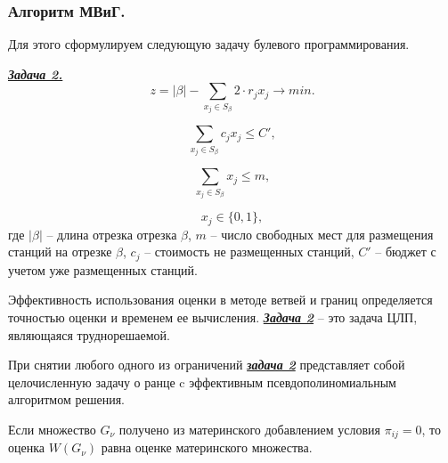 \begin{frame}
    
    \frametitle{Алгоритм МВиГ.}
    \fontsize{8pt}{7.2}\selectfont
    Для этого сформулируем следующую задачу булевого программирования.

    \underline{\textit{\textbf{Задача 2.}}}
    \begin{displaymath}\label{present:task2}
        z = |\beta| - \sum\limits_{x_j \in S_\beta} 2 \cdot r_j x_j \rightarrow min.
    \end{displaymath}

    \begin{displaymath}\label{eq:part4_task2_cost}
        \sum\limits_{x_j \in S_\beta} c_j x_j \leqslant C',
    \end{displaymath}

    \begin{displaymath}\label{eq:part4_task2_m}
        \sum\limits_{x_j \in S_\beta} x_j \leqslant m,
    \end{displaymath}

    \begin{displaymath}
        x_j \in \{0, 1\},
    \end{displaymath}
    где $|\beta|$ -- длина отрезка отрезка  $\beta$, $m$ -- число свободных мест для размещения станций на отрезке $\beta$, $c_j$ -- стоимость не размещенных станций, $C'$ -- бюджет с учетом уже размещенных станций.

    \bigskip
    Эффективность использования оценки в методе ветвей и границ определяется точностью оценки и временем ее вычисления. \underline{\textit{\textbf{Задача 2}}} -- это задача ЦЛП, являющаяся труднорешаемой. 

    При снятии любого одного из ограничений \underline{\textit{\textbf{задача 2}}} представляет собой целочисленную задачу о ранце c эффективным псевдополиномиальным алгоритмом решения.
    
    \bigskip
    Если множество $G_\nu$ получено из материнского добавлением условия $\pi_{ij}=0$, то оценка $W(G_\nu)$ равна оценке материнского множества.

\end{frame}

